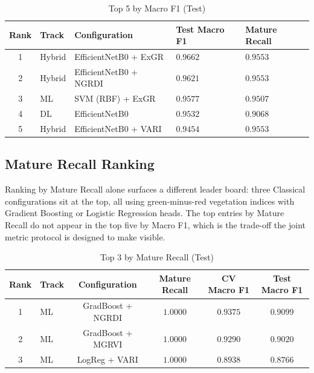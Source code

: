 \begin{table}[H]
    \centering
    \caption{Top 5 by Macro F1 (Test)}
    \label{tab:rank-f1}
    \begin{tabular}{cllll}
        \hline
        Rank & Track & Configuration & Test Macro F1 & Mature Recall \\
        \hline
        1 & Hybrid & EfficientNetB0 + ExGR  & $0.9662$ & $0.9553$ \\
        2 & Hybrid & EfficientNetB0 + NGRDI & $0.9621$ & $0.9553$ \\
        3 & ML     & SVM (RBF) + ExGR       & $0.9577$ & $0.9507$ \\
        4 & DL     & EfficientNetB0         & $0.9532$ & $0.9068$ \\
        5 & Hybrid & EfficientNetB0 + VARI  & $0.9454$ & $0.9553$ \\
        \hline
    \end{tabular}
\end{table}

\subsection{Mature Recall Ranking}

Ranking by Mature Recall alone surfaces a different leader board: three Classical configurations sit at the top, all using green-minus-red vegetation indices with Gradient Boosting or Logistic Regression heads. The top entries by Mature Recall do not appear in the top five by Macro F1, which is the trade-off the joint metric protocol is designed to make visible.

\begin{table}[H]
    \centering
    \caption{Top 3 by Mature Recall (Test)}
    \label{tab:rank-mature}
    \footnotesize
    \setlength{\tabcolsep}{5pt}
    \renewcommand{\arraystretch}{1.15}
    \begin{tabular}{@{}clcccc@{}}
        \hline
        Rank & Track & Configuration & Mature Recall & CV Macro F1 & Test Macro F1 \\
        \hline
        1 & ML & GradBoost + NGRDI & $1.0000$ & $0.9375$ & $0.9099$ \\
        2 & ML & GradBoost + MGRVI & $1.0000$ & $0.9290$ & $0.9020$ \\
        3 & ML & LogReg + VARI     & $1.0000$ & $0.8938$ & $0.8766$ \\
        \hline
    \end{tabular}
\end{table}

